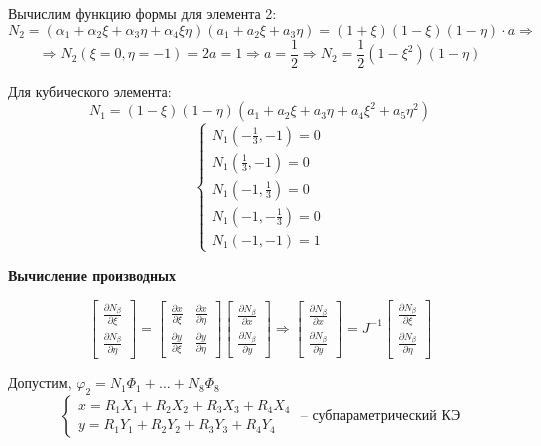 \documentclass{bmstu}
\begin{document}
Вычислим функцию формы для элемента 2:
\[
N_2=(\alpha_1+\alpha_2\xi+\alpha_3\eta+\alpha_4\xi\eta)(a_1+a_2\xi+a_3\eta)=(1+\xi)(1-\xi)(1-\eta)\cdot a \Rightarrow
\]
\[
	\Rightarrow 
	N_2(\xi=0, \eta=-1)=2a=1\Rightarrow a=\frac{1}{2} \Rightarrow N_2=\frac{1}{2}(1-\xi^2)(1-\eta)
\]

Для кубического элемента:
\[
N_1=(1-\xi)(1-\eta)(a_1+a_2\xi+a_3\eta+a_4\xi^2+a_5\eta^2)
\]
\[
\begin{cases}
	N_1(-\frac{1}{3},-1)=0  \\
	N_1(\frac{1}{3},-1)=0 \\
	N_1(-1,\frac{1}{3})=0 \\
	N_1(-1, -\frac{1}{3})=0 \\
	N_1(-1,-1)=1
\end{cases}
\]

\begin{center}
	\textbf{Вычисление производных}
\end{center}
\[
\begin{bmatrix}
	\frac{\partial N_{\beta}}{\partial \xi} \\
	\frac{\partial N_{\beta}}{\partial \eta}
\end{bmatrix} = \begin{bmatrix}
\frac{\partial x}{\partial \xi} & \frac{\partial x}{\partial \eta} \\
\frac{\partial y}{\partial \xi} & \frac{\partial y}{\partial \eta}
\end{bmatrix} \begin{bmatrix}
\frac{\partial N_{\beta}}{\partial x} \\
\frac{\partial N_{\beta}}{\partial y}
\end{bmatrix} \Rightarrow \begin{bmatrix}
\frac{\partial N_{\beta}}{\partial x} \\
\frac{\partial N_{\beta}}{\partial y}
\end{bmatrix}=J^{-1} \begin{bmatrix}
\frac{\partial N_{\beta}}{\partial \xi} \\
\frac{\partial N_{\beta}}{\partial \eta}
\end{bmatrix}
\]

Допустим, $\varphi_2=N_1\Phi_1+\dots+N_8\Phi_8$
\[
\begin{cases}
	x=R_1X_1+R_2X_2+R_3X_3+R_4X_4 \\
	y=R_1Y_1+R_2Y_2+R_3Y_3+R_4Y_4
\end{cases}  \text{ -- субпараметрический КЭ}
\]
\end{document}
